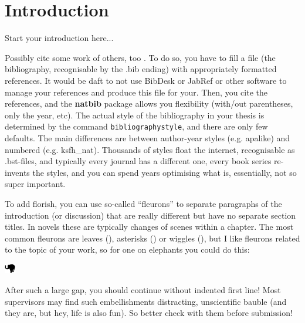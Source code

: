\chapter{Introduction}
\label{ch:introduction}


Start your introduction here...

Possibly cite some work of others, too \citep{Adiku.ea:1995:USO}. To do so, you have to fill a file (the bibliography, recognisable by the .bib ending) with appropriately formatted references. It would be daft to not use BibDesk or JabRef or other software to manage your references and produce this file for your. Then, you cite the references, and the \textbf{natbib} package allows you flexibility (with/out parentheses, only the year, etc). The actual style of the bibliography in your thesis is determined by the command \texttt{bibliographystyle}, and there are only few defaults. The main differences are between author-year styles (e.g. apalike) and numbered (e.g. ksfh\_nat). Thousands of styles float the internet, recognisable as .bst-files, and typically every journal has a different one, every book series re-invents the styles, and you can spend years optimising what is, essentially, not so super important.

To add florish, you can use so-called ``fleurons'' to separate paragraphs of the introduction (or discussion) that are really different but have no separate section titles. In novels these are typically changes of scenes within a chapter. The most common fleurons are leaves (\adfhangingflatleafright), asterisks () or wiggles (),
but I like fleurons related to the topic of your work, so for one on elephants you could do this: 

{\centering
	\includegraphics[width=0.5cm]{images/elephant.png}
	
}

\noindent After such a large gap, you should continue without indented first line! Most supervisors may find such embellishments distracting, unscientific bauble (and they are, but hey, life is also fun). So better check with them before submission!

%

